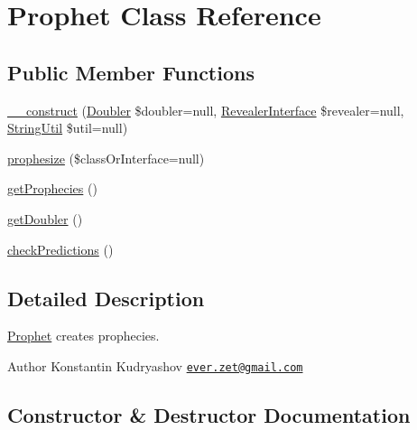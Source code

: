 \hypertarget{class_prophecy_1_1_prophet}{}\section{Prophet Class Reference}
\label{class_prophecy_1_1_prophet}
\subsection*{Public Member Functions}
\begin{DoxyCompactItemize}
\item 
\mbox{\hyperlink{class_prophecy_1_1_prophet_a593bea02c73d9db266af7a7d92c30d6c}{\+\_\+\+\_\+construct}} (\mbox{\hyperlink{class_prophecy_1_1_doubler_1_1_doubler}{Doubler}} \$doubler=null, \mbox{\hyperlink{interface_prophecy_1_1_prophecy_1_1_revealer_interface}{Revealer\+Interface}} \$revealer=null, \mbox{\hyperlink{class_prophecy_1_1_util_1_1_string_util}{String\+Util}} \$util=null)
\item 
\mbox{\hyperlink{class_prophecy_1_1_prophet_aee3901b35180731fb3b3bc51de4d894b}{prophesize}} (\$class\+Or\+Interface=null)
\item 
\mbox{\hyperlink{class_prophecy_1_1_prophet_a06770379bed34f1d3b9173c9a33f9f4e}{get\+Prophecies}} ()
\item 
\mbox{\hyperlink{class_prophecy_1_1_prophet_a37e4dba69fc63fdec7ce094ae5d888ee}{get\+Doubler}} ()
\item 
\mbox{\hyperlink{class_prophecy_1_1_prophet_afe8e0b9b20a710e8f93bcc941181a4b1}{check\+Predictions}} ()
\end{DoxyCompactItemize}


\subsection{Detailed Description}
\mbox{\hyperlink{class_prophecy_1_1_prophet}{Prophet}} creates prophecies.

\begin{DoxyAuthor}{Author}
Konstantin Kudryashov \href{mailto:ever.zet@gmail.com}{\tt ever.\+zet@gmail.\+com} 
\end{DoxyAuthor}


\subsection{Constructor \& Destructor Documentation}
\mbox{\label{class_prophecy_1_1_prophet_a593bea02c73d9db266af7a7d92c30d6c}} 
